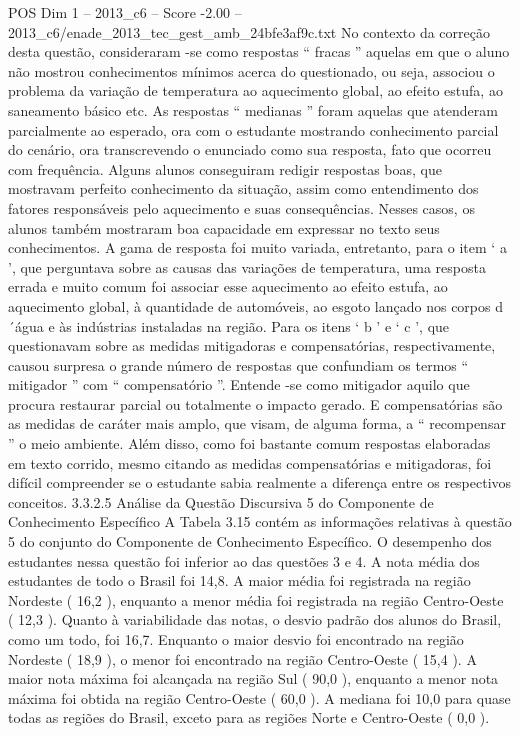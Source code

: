 \begin{textsample}{POS Dim 1 – 2013\_c6 – Score -2.00 – 2013\_c6/enade\_2013\_tec\_gest\_amb\_24bfe3af9c.txt}
No contexto da correção desta questão, consideraram -se como respostas “ fracas ” aquelas em que o aluno não mostrou conhecimentos mínimos acerca do questionado, ou seja, associou o problema da variação de temperatura ao aquecimento global, ao efeito estufa, ao saneamento básico etc.
As respostas “ medianas ” foram aquelas que atenderam parcialmente ao esperado, ora com o estudante mostrando conhecimento parcial do cenário, ora transcrevendo o enunciado como sua resposta, fato que ocorreu com frequência.
Alguns alunos conseguiram redigir respostas boas, que mostravam perfeito conhecimento da situação, assim como entendimento dos fatores responsáveis pelo aquecimento e suas consequências.
Nesses casos, os alunos também mostraram boa capacidade em expressar no texto seus conhecimentos.
A gama de resposta foi muito variada, entretanto, para o item ‘ a ’, que perguntava sobre as causas das variações de temperatura, uma resposta errada e muito comum foi associar esse aquecimento ao efeito estufa, ao aquecimento global, à quantidade de automóveis, ao esgoto lançado nos corpos d´água e às indústrias instaladas na região.
Para os itens ‘ b ’ e ‘ c ’, que questionavam sobre as medidas mitigadoras e compensatórias, respectivamente, causou surpresa o grande número de respostas que confundiam os termos “ mitigador ” com “ compensatório ”.
Entende -se como mitigador aquilo que procura restaurar parcial ou totalmente o impacto gerado.
E compensatórias são as medidas de caráter mais amplo, que visam, de alguma forma, a “ recompensar ” o meio ambiente.
Além disso, como foi bastante comum respostas elaboradas em texto corrido, mesmo citando as medidas compensatórias e mitigadoras, foi difícil compreender se o estudante sabia realmente a diferença entre os respectivos conceitos. 3.3.2.5 Análise da Questão Discursiva 5 do Componente de Conhecimento Específico A Tabela 3.15 contém as informações relativas à questão 5 do conjunto do Componente de Conhecimento Específico.
O desempenho dos estudantes nessa questão foi inferior ao das questões 3 e 4.
A nota média dos estudantes de todo o Brasil foi 14,8.
A maior média foi registrada na região Nordeste ( 16,2 ), enquanto a menor média foi registrada na região Centro-Oeste ( 12,3 ).
Quanto à variabilidade das notas, o desvio padrão dos alunos do Brasil, como um todo, foi 16,7.
Enquanto o maior desvio foi encontrado na região Nordeste ( 18,9 ), o menor foi encontrado na região Centro-Oeste ( 15,4 ).
A maior nota máxima foi alcançada na região Sul ( 90,0 ), enquanto a menor nota máxima foi obtida na região Centro-Oeste ( 60,0 ).
A mediana foi 10,0 para quase todas as regiões do Brasil, exceto para as regiões Norte e Centro-Oeste ( 0,0 ).

\end{textsample}
